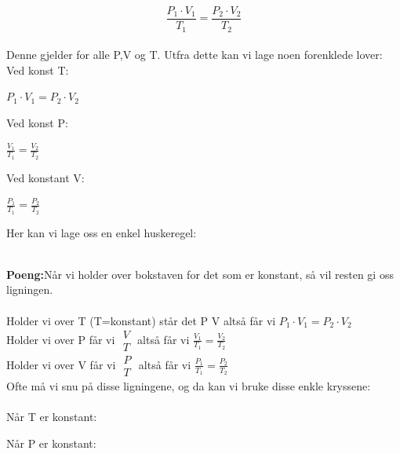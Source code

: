 \documentclass[12pt,a4paper]{article}
\begin{document}
    $$\frac{P_1\cdot V_1}{T_1}=\frac{P_2\cdot V_2}{T_2}$$\\

Denne gjelder for alle P,V og T. Utfra dette kan vi lage noen forenklede lover:\\
Ved konst T:
\begin{center}
    $P_1\cdot V_1=P_2\cdot V_2$
\end{center}
Ved konst P:
\begin{center}
    $\frac{V_1}{T_1}=\frac{V_2}{T_2}$
\end{center}
Ved konstant V:
\begin{center}
    $\frac{P_1}{T_1}=\frac{P_2}{T_2}$
\end{center}
Her kan vi lage oss en enkel huskeregel:
\begin{figure}[h]
    \vspace{2cm}  %
    \centering
{}
\end{figure}\\
\textbf{Poeng:}Når vi holder over bokstaven for det som er konstant, så vil resten gi oss ligningen.\\\\
Holder vi over T (T=konstant) står det P V altså får vi $P_1\cdot V_1=P_2\cdot V_2$\\
Holder vi over P får vi $\begin{matrix}V\\T\end{matrix}$  altså får vi $\frac{V_1}{T_1}=\frac{V_2}{T_2}$\\
Holder vi over V får vi $\begin{matrix}P\\T\end{matrix}$  altså får vi $\frac{P_1}{T_1}=\frac{P_2}{T_2}$  
\\Ofte må vi snu på disse ligningene, og da kan vi bruke disse enkle kryssene:\\\\
Når T er konstant:
\begin{center}
\end{center}\newpage
Når P er konstant:\\
\begin{center}
\end{center}
\end{document}
